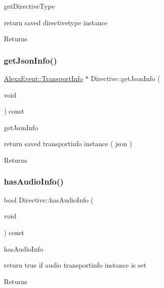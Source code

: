get\+Directive\+Type 

return saved directivetype instance \begin{DoxyReturn}{Returns}

\end{DoxyReturn}
\mbox{\label{classdirective_1_1Directive_a026cf59dfe62697996942ca06f859158}} 
\subsubsection{\texorpdfstring{get\+Json\+Info()}{getJsonInfo()}}
{\footnotesize\ttfamily \hyperlink{classAlexaEvent_1_1TransportInfo}{Alexa\+Event\+::\+Transport\+Info} $\ast$ Directive\+::get\+Json\+Info (\begin{DoxyParamCaption}\item[{void}]{ }\end{DoxyParamCaption}) const}



get\+Json\+Info 

return saved transportinfo instance ( json ) \begin{DoxyReturn}{Returns}

\end{DoxyReturn}
\mbox{\label{classdirective_1_1Directive_a4f8197c2858b56499b9e91ccf7b19aa3}} 
\subsubsection{\texorpdfstring{has\+Audio\+Info()}{hasAudioInfo()}}
{\footnotesize\ttfamily bool Directive\+::has\+Audio\+Info (\begin{DoxyParamCaption}\item[{void}]{ }\end{DoxyParamCaption}) const}



has\+Audio\+Info 

return true if audio transportinfo instance is set \begin{DoxyReturn}{Returns}

\end{DoxyReturn}
\mbox{\label{classdirective_1_1Directive_a79ea767cd28592072064c3e0442be9c9}} 

